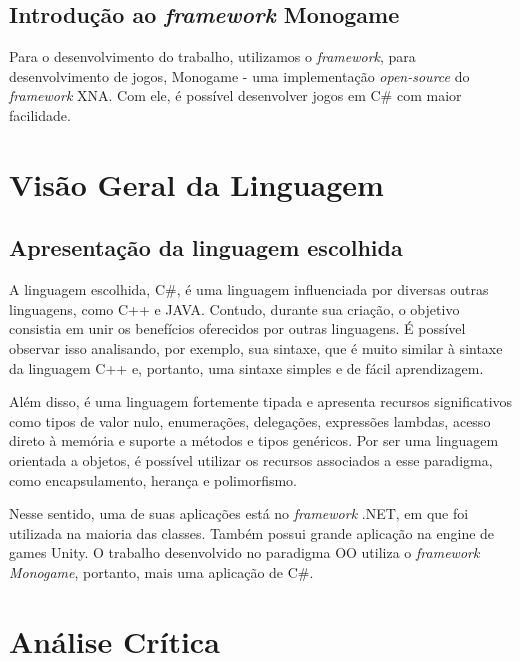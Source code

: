 \documentclass[rel_mlp]{iiufrgs}
\begin{document}
\section{Introdução ao \textit{framework} Monogame}

Para o desenvolvimento do trabalho, utilizamos o \textit{framework}, para desenvolvimento de jogos, Monogame - uma implementação \textit{open-source} do \textit{framework} XNA. Com ele, é possível desenvolver jogos em C\# com maior facilidade.

%
\chapter{Visão Geral da Linguagem}

\section{Apresentação da linguagem escolhida}

A linguagem escolhida, C\#, é uma linguagem influenciada por diversas outras linguagens, como C++ e JAVA. Contudo, durante sua criação, o objetivo consistia em unir os benefícios oferecidos por outras linguagens. É possível observar isso analisando, por exemplo, sua sintaxe, que é muito similar à sintaxe da linguagem C++ e, portanto, uma sintaxe simples e de fácil aprendizagem. 

Além disso, é uma linguagem fortemente tipada e apresenta recursos significativos como tipos de valor nulo, enumerações, delegações, expressões lambdas, acesso direto à memória e suporte a métodos e tipos genéricos. Por ser uma linguagem orientada a objetos, é possível utilizar os recursos associados a esse paradigma, como encapsulamento, herança e polimorfismo. 

Nesse sentido, uma de suas aplicações está no \textit{framework} .NET, em que foi utilizada na maioria das classes. Também possui grande aplicação na engine de games Unity. O trabalho desenvolvido no paradigma OO utiliza o \textit{framework} \textit{Monogame}, portanto, mais uma aplicação de C\#.

%
\chapter{Análise Crítica}
\end{document}
